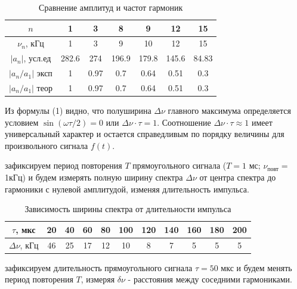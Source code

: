 \begin{table}[h!]
    \centering
    \begin{tabular}{|c|c|c|c|c|c|c|}
        \hline
        $n$ & 1 & 3 & 8 & 9 & 12 & 15\\\hline
        $\nu_n$, кГц & 1 & 3 & 9 & 10 & 12 & 15\\\hline 
        $|a_n|$, усл.ед & 282.6 & 274 & 196.9 & 179.8 & 145.6 & 84.83\\\hline
        $|a_n / a_1|$ эксп & 1 & 0.97 & 0.7 & 0.64 & 0.51 & 0.3\\\hline
        $|a_n / a_1|$ теор & 1 & 0.97 & 0.7 & 0.64 & 0.51 & 0.3\\\hline
    \end{tabular}
    \caption{Сравнение амплитуд и частот гармоник}
\end{table}

\indent Из формулы (1) видно, что полуширина $\Delta \nu$ главного максимума определяется условием $\sin(\omega \tau/2) = 0$ или $\Delta \nu \cdot \tau = 1$. Соотношение $\Delta\nu\cdot\tau \approx 1$ имеет универсальный характер и остается справедливым по порядку величины для произвольного сигнала $f(t)$.

 зафиксируем период повторения $T$ прямоугольного сигнала ($T = 1$ мс; $\nu_{\text{повт}} =$ 1кГц) и будем измерять полную ширину спектра $\Delta \nu$ от центра спектра до гармоники с нулевой амплитудой, изменяя длительность импульса.
\begin{table}[h!]
    \centering
    \begin{tabular}{|c|c|c|c|c|c|c|c|c|c|c|}
        \hline
        $\tau$, мкс & 20& 40& 60& 80& 100& 120& 140& 160& 180& 200\\\hline
        $\Delta\nu$, кГц & 46& 25& 17& 12& 10& 8& 7& 5& 5& 5 \\\hline
    \end{tabular}
    \caption{Зависимость ширины спектра от длительности импульса}
\end{table}

 зафиксируем длительность прямоугольного сигнала $\tau = 50$ мкс и будем менять период повторения $T$, измеряя $\delta \nu$ - расстояния между соседними гармониками.


